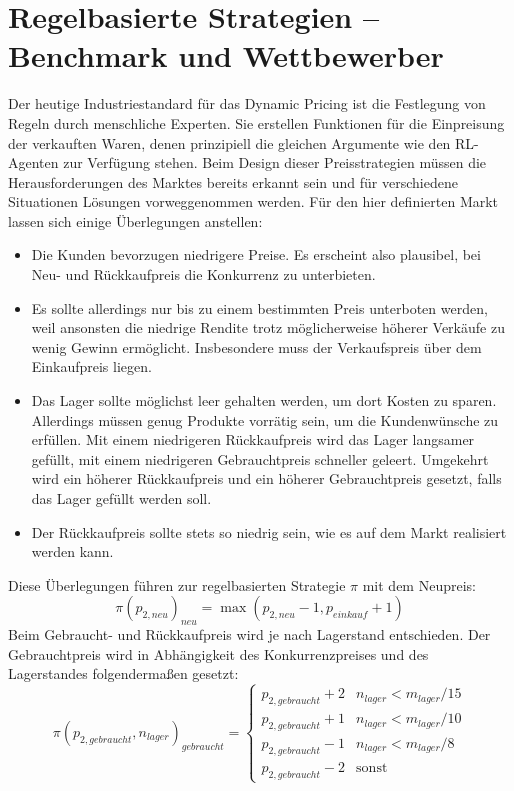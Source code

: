 \section{Regelbasierte Strategien -- Benchmark und Wettbewerber}
\label{section:rulebased}
Der heutige Industriestandard für das Dynamic Pricing ist die Festlegung von Regeln durch menschliche Experten.
Sie erstellen Funktionen für die Einpreisung der verkauften Waren, denen prinzipiell die gleichen Argumente wie den RL-Agenten zur Verfügung stehen.
Beim Design dieser Preisstrategien müssen die Herausforderungen des Marktes bereits erkannt sein und für verschiedene Situationen Lösungen vorweggenommen werden.
Für den hier definierten Markt lassen sich einige Überlegungen anstellen:
\begin{itemize}
	\item Die Kunden bevorzugen niedrigere Preise.
	Es erscheint also plausibel, bei Neu- und Rückkaufpreis die Konkurrenz zu unterbieten.
	\item Es sollte allerdings nur bis zu einem bestimmten Preis unterboten werden, weil ansonsten die niedrige Rendite trotz möglicherweise höherer Verkäufe zu wenig Gewinn ermöglicht.
	Insbesondere muss der Verkaufspreis über dem Einkaufpreis liegen.
	\item Das Lager sollte möglichst leer gehalten werden, um dort Kosten zu sparen.
	Allerdings müssen genug Produkte vorrätig sein, um die Kundenwünsche zu erfüllen.
	Mit einem niedrigeren Rückkaufpreis wird das Lager langsamer gefüllt, mit einem niedrigeren Gebrauchtpreis schneller geleert.
	Umgekehrt wird ein höherer Rückkaufpreis und ein höherer Gebrauchtpreis gesetzt, falls das Lager gefüllt werden soll.
	\item Der Rückkaufpreis sollte stets so niedrig sein, wie es auf dem Markt realisiert werden kann.
\end{itemize}
Diese Überlegungen führen zur regelbasierten Strategie $\pi$ mit dem Neupreis:
\begin{equation}
	\pi\left(p_{2, neu}\right)_{neu} = \max{\left(p_{2, neu} - 1, p_{einkauf} + 1\right)}
\end{equation}
Beim Gebraucht- und Rückkaufpreis wird je nach Lagerstand entschieden.
Der Gebrauchtpreis wird in Abhängigkeit des Konkurrenzpreises und des Lagerstandes folgendermaßen gesetzt:
\begin{equation}
	\pi\left(p_{2, gebraucht}, n_{lager}\right)_{gebraucht} =
	\begin{cases}
		p_{2, gebraucht} + 2 & n_{lager} < m_{lager} / 15\\
		p_{2, gebraucht} + 1 & n_{lager} < m_{lager} / 10\\
		p_{2, gebraucht} - 1 & n_{lager} < m_{lager} / 8\\
		p_{2, gebraucht} - 2 & \text{sonst}
	\end{cases}
\end{equation}
